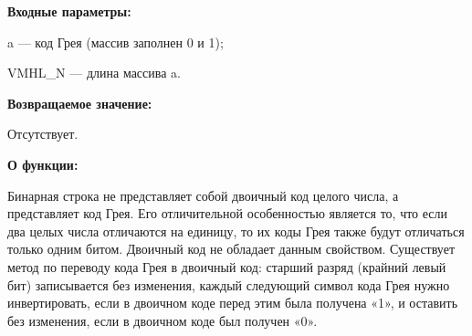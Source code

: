 \textbf{Входные параметры:}
 
 a --- код Грея (массив заполнен 0 и 1);
 
 VMHL\_N --- длина массива a.
 
\textbf{Возвращаемое значение:}

 Отсутствует.
 
\textbf{О функции:}

Бинарная строка не представляет собой двоичный код целого числа, а представляет код Грея. Его отличительной особенностью является то, что если два целых числа отличаются на единицу, то их коды Грея также будут отличаться только одним битом. Двоичный код не обладает данным свойством.
Существует метод по переводу кода Грея в двоичный код: старший разряд (крайний левый бит) записывается без изменения, каждый следующий символ кода Грея нужно инвертировать, если в двоичном коде перед этим была получена «1», и оставить без изменения, если в двоичном коде был получен «0». 